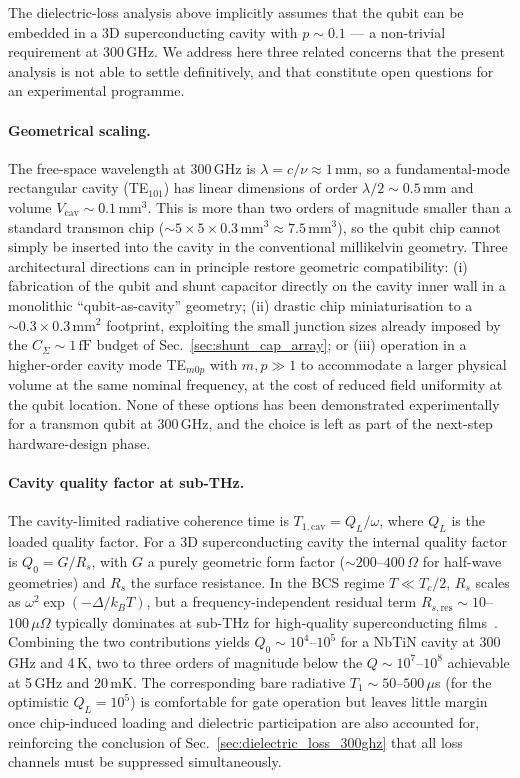 The dielectric-loss analysis above implicitly assumes that the qubit can be
embedded in a 3D superconducting cavity with $p \sim 0.1$ — a non-trivial
requirement at 300\,GHz. We address here three related concerns that the
present analysis is not able to settle definitively, and that constitute open
questions for an experimental programme.

\paragraph{Geometrical scaling.}
The free-space wavelength at 300\,GHz is $\lambda = c/\nu \approx 1\,\text{mm}$,
so a fundamental-mode rectangular cavity (TE$_{101}$) has linear dimensions of
order $\lambda/2 \sim 0.5\,\text{mm}$ and volume
$V_{\text{cav}} \sim 0.1\,\text{mm}^{3}$. This is more than two orders of
magnitude smaller than a standard transmon chip
($\sim 5\times 5\times 0.3\,\text{mm}^{3} \approx 7.5\,\text{mm}^{3}$),
so the qubit chip cannot simply be inserted into the cavity in the conventional
millikelvin geometry. Three architectural directions can in principle restore
geometric compatibility: (i) fabrication of the qubit and shunt capacitor
directly on the cavity inner wall in a monolithic ``qubit-as-cavity'' geometry;
(ii) drastic chip miniaturisation to a $\sim 0.3 \times 0.3\,\text{mm}^{2}$
footprint, exploiting the small junction sizes already imposed by the
$C_{\Sigma}\sim 1\,\text{fF}$ budget of Sec.~\ref{sec:shunt_cap_array}; or
(iii) operation in a higher-order cavity mode TE$_{m0p}$ with $m,p\gg 1$
to accommodate a larger physical volume at the same nominal frequency, at
the cost of reduced field uniformity at the qubit location. None of these
options has been demonstrated experimentally for a transmon qubit at 300\,GHz,
and the choice is left as part of the next-step hardware-design phase.

\paragraph{Cavity quality factor at sub-THz.}
The cavity-limited radiative coherence time is
$T_{1,\text{cav}} = Q_L/\omega$, where $Q_L$ is the loaded quality factor.
For a 3D superconducting cavity the internal quality factor is
$Q_0 = G/R_s$, with $G$ a purely geometric form factor
($\sim 200$--$400\,\Omega$ for half-wave geometries) and $R_s$ the surface
resistance. In the BCS regime $T \ll T_c/2$, $R_s$ scales as
$\omega^{2} \exp(-\Delta/k_B T)$, but a frequency-independent residual term
$R_{s,\text{res}}\sim 10$--$100\,\mu\Omega$ typically dominates at sub-THz for
high-quality superconducting films~\cite{Romanenko2020}. Combining the two
contributions yields $Q_0 \sim 10^{4}$--$10^{5}$ for a NbTiN cavity at 300\,GHz
and 4\,K, two to three orders of magnitude below the $Q\sim 10^{7}$--$10^{8}$
achievable at 5\,GHz and 20\,mK. The corresponding bare radiative
$T_1 \sim 50$--$500\,\mu$s (for the optimistic $Q_L=10^{5}$) is comfortable
for gate operation but leaves little margin once chip-induced loading and
dielectric participation are also accounted for, reinforcing the conclusion
of Sec.~\ref{sec:dielectric_loss_300ghz} that all loss channels must be
suppressed simultaneously.

